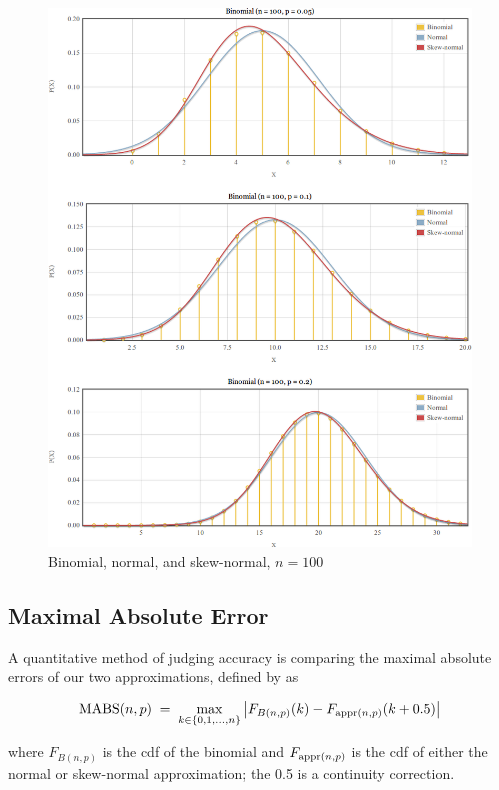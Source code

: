 \documentclass{article}
\begin{document}
\begin{figure}
  \centering
  \includegraphics[width=\textwidth]{../images/comparison-n100.png}
  \caption{Binomial, normal, and skew-normal, $n=100$}
  \label{fig:comparison-n100}
\end{figure}

\subsection{Maximal Absolute Error}
\label{subsec:mabs}

A quantitative method of judging accuracy is comparing the maximal absolute
errors of our two approximations, defined by \citet{mabs} as

\begin{equation}
  \textnormal{MABS}(n, p) \;=\; \max_{k \in \{0, 1,...,n\}} \left| F_{B(n,p)} (k) -  F_{\textnormal{appr}(n,p)}(k + 0.5) \right|
\end{equation}

where $F_{B(n,p)}$ is the cdf of the binomial and $F_{\textnormal{appr}(n,p)}$
is the cdf of either the normal or skew-normal approximation; the 0.5 is a
continuity correction.
\end{document}
